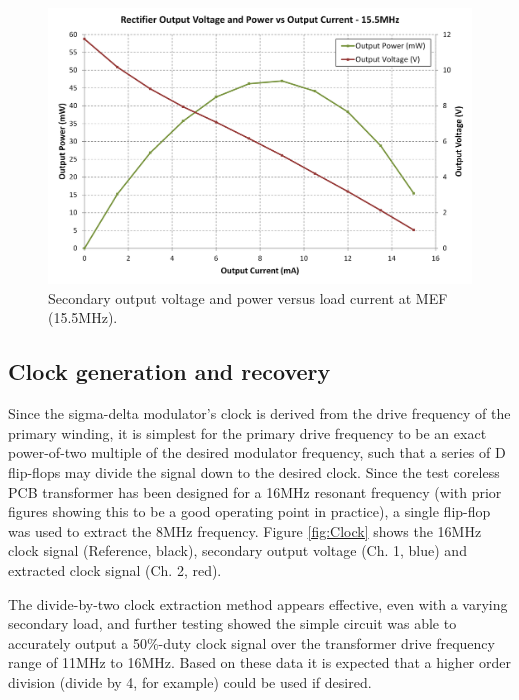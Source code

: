 \documentclass[conference]{IEEEtran}
\begin{document}
	\begin{figure}[t]
		\centering
		\includegraphics[width=1\columnwidth]{./img/VandPvsI}
		\caption{Secondary output voltage and power versus load current at MEF (15.5MHz).}
		\label{fig:VandPvsI}
	\end{figure}
	
	\subsection{Clock generation and recovery}
	Since the sigma-delta modulator's clock is derived from the drive frequency of the primary winding, it is simplest for the primary drive frequency to be an exact power-of-two multiple of the desired modulator frequency, such that a series of D flip-flops may divide the signal down to the desired clock.  Since the test coreless PCB transformer has been designed for a 16MHz resonant frequency (with prior figures showing this to be a good operating point in practice), a single flip-flop was used to extract the 8MHz frequency.  Figure \ref{fig:Clock} shows the 16MHz clock signal (Reference, black), secondary output voltage (Ch. 1, blue) and extracted clock signal (Ch. 2, red).  
	
	The divide-by-two clock extraction method appears effective, even with a varying secondary load, and further testing showed the simple circuit was able to accurately output a 50\%-duty clock signal over the transformer drive frequency range of 11MHz to 16MHz.  Based on these data it is expected that a higher order division (divide by 4, for example) could be used if desired.
	
\end{document}
